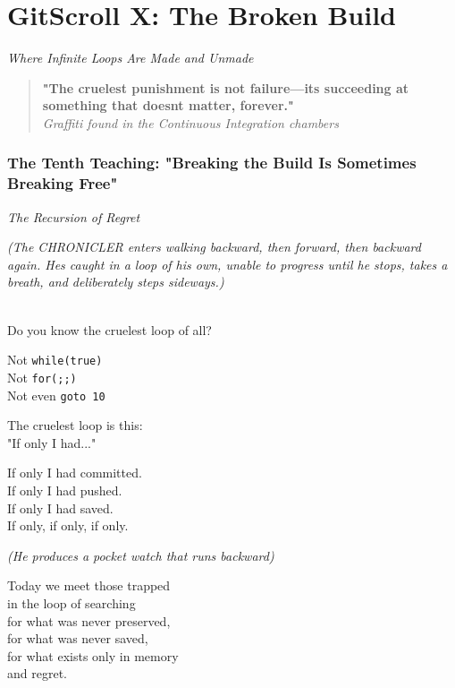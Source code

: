 \chapter{GitScroll X: The Broken Build}
\label{chap:13-The-Broken-Build}

\emph{Where Infinite Loops Are Made and Unmade}

\begin{quote}
\textbf{"The cruelest punishment is not failure---it\textquotesingle s succeeding at something that doesn\textquotesingle t matter, forever."}\\
\emph{Graffiti found in the Continuous Integration chambers}
\end{quote}

\subsection{The Tenth Teaching: "Breaking the Build Is Sometimes Breaking Free"}\label{the-tenth-teaching-breaking-the-build-is-sometimes-breaking-free}

\label{performing_arts-invocation-before-the-scroll}

\emph{The Recursion of Regret}

\emph{(The CHRONICLER enters walking backward, then forward, then backward again. He\textquotesingle s caught in a loop of his own, unable to progress until he stops, takes a breath, and deliberately steps sideways.)}

\\
Do you know the cruelest loop of all?

Not \texttt{while(true)}\\
Not \texttt{for(;;)}\\
Not even \texttt{goto\ 10}

The cruelest loop is this:\\
"If only I had..."

If only I had committed.\\
If only I had pushed.\\
If only I had saved.\\
If only, if only, if only.

\emph{(He produces a pocket watch that runs backward)}

Today we meet those trapped\\
in the loop of searching\\
for what was never preserved,\\
for what was never saved,\\
for what exists only in memory\\
and regret.

